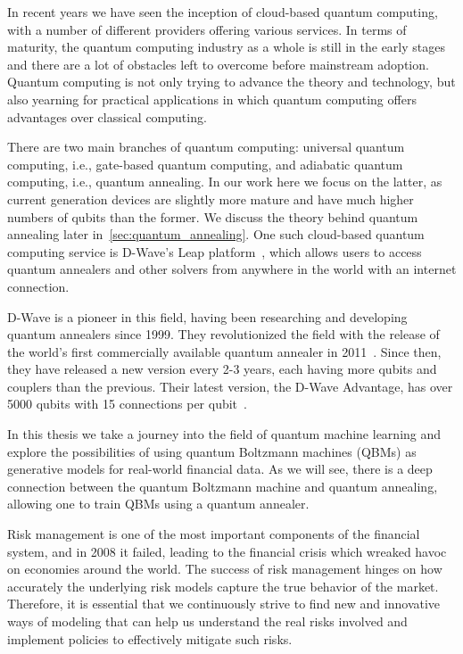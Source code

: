 In recent years we have seen the inception of cloud-based quantum computing, with a number of different providers offering various services.
In terms of maturity, the quantum computing industry as a whole is still in the early stages and there are a lot of obstacles left to overcome before mainstream adoption.
Quantum computing is not only trying to advance the theory and technology, but also yearning for practical applications in which quantum computing offers advantages over classical computing.

There are two main branches of quantum computing: universal quantum computing, i.e., gate-based quantum computing, and adiabatic quantum computing, i.e., quantum annealing.
In our work here we focus on the latter, as current generation devices are slightly more mature and have much higher numbers of qubits than the former.
We discuss the theory behind quantum annealing later in~\cref{sec:quantum_annealing}.
One such cloud-based quantum computing service is D-Wave's Leap platform~\cite{dwave_leap}, which allows users to access quantum annealers and other solvers from anywhere in the world with an internet connection.

D-Wave is a pioneer in this field, having been researching and developing quantum annealers since 1999.
They revolutionized the field with the release of the world's first commercially available quantum annealer in 2011~\cite{zyga_2011}.
Since then, they have released a new version every 2-3 years, each having more qubits and couplers than the previous.
Their latest version, the D-Wave Advantage, has over 5000 qubits with 15 connections per qubit~\cite{dwave_advantage}.

In this thesis we take a journey into the field of quantum machine learning and explore the possibilities of using quantum Boltzmann machines (QBMs) as generative models for real-world financial data.
As we will see, there is a deep connection between the quantum Boltzmann machine and quantum annealing, allowing one to train QBMs using a quantum annealer.

Risk management is one of the most important components of the financial system, and in 2008 it failed, leading to the financial crisis which wreaked havoc on economies around the world.
The success of risk management hinges on how accurately the underlying risk models capture the true behavior of the market.
Therefore, it is essential that we continuously strive to find new and innovative ways of modeling that can help us understand the real risks involved and implement policies to effectively mitigate such risks.

